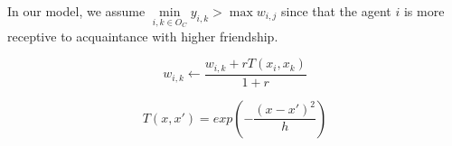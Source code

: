 \documentclass[11pt]{article}
\theoremstyle{definition}
\theoremstyle{basic}
\begin{document}
In our model, we assume $\min\limits_{{i,k}\in O_C}{y_{i,k}}>\max{w_{i,j}}$ since that the agent $i$ is more receptive to acquaintance with higher friendship. 

\begin{equation}
w_{i,k} \gets \frac{w_{i,k} + rT(x_i,x_k)}{1+r}
\end{equation} 

\begin{equation}
T(x,x{'})=exp(-\frac{(x-x{'})^2}{h})
\end{equation} 

\end{document}
